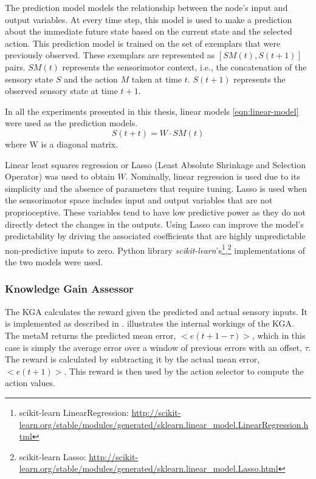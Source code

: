 The prediction model models the relationship between the node's input and output variables. At every time step, this model is used to make a prediction about the immediate future state based on the current state and the selected action. This prediction model is trained on the set of exemplars that were previously observed. These exemplars are represented as $[SM(t),S(t+1)]$ pairs. $SM(t)$ represents the sensorimotor context, i.e., the concatenation of the sensory state $S$ and the action $M$ taken at time $t$. $S(t+1)$ represents the observed sensory state at time $t+1$. 

In all the experiments presented in this thesis, linear models \eqref{eqn:linear-model} were used as the prediction models.
\begin{equation}\label{eqn:linear-model}
	S(t+t) = W \cdot SM(t)
\end{equation}
where W is a diagonal matrix.

Linear least squares regression or Lasso (Least Absolute Shrinkage and Selection Operator) \cite{Tibshirani1996} was used to obtain $W$. Nominally, linear regression is used due to its simplicity and the absence of parameters that require tuning. Lasso is used when the sensorimotor space includes input and output variables that are not proprioceptive. These variables tend to have low predictive power as they do not directly detect the changes in the outputs. Using Lasso can improve the model's predictability by driving the associated coefficients that are highly unpredictable non-predictive inputs to zero. Python library \textit{scikit-learn}'s\footnote{scikit-learn LinearRegression: \url{http://scikit-learn.org/stable/modules/generated/sklearn.linear_model.LinearRegression.html}},\footnote{scikit-learn Lasso: \url{http://scikit-learn.org/stable/modules/generated/sklearn.linear_model.Lasso.html}} implementations of the two models were used. 

\subsubsection{Knowledge Gain Assessor}

The KGA calculates the reward given the predicted and actual sensory inputs. It is implemented as described in \cite{Oudeyer2007}.  illustrates the internal workings of the KGA. The metaM returns the predicted mean error, $<e(t+1-\tau)>$, which in this case is simply the average error over a window of previous errors with an offset, $\tau$. The reward is calculated by subtracting it by the actual mean error, $<e(t+1)>$. This reward is then used by the action selector to compute the action values. 

